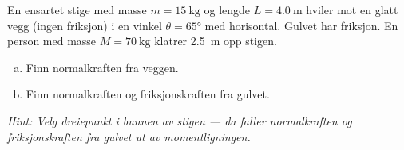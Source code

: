 %
%
En ensartet stige med masse $m = \SI{15}{\kilo\gram}$ og lengde $L = \SI{4.0}{\metre}$ hviler mot en glatt vegg (ingen friksjon) i en vinkel $\theta = 65°$ med horisontal. Gulvet har friksjon. En person med masse $M = \SI{70}{\kilo\gram}$ klatrer \SI{2.5}{\metre} opp stigen.
\begin{enumerate}[a)]
  \item Finn normalkraften fra veggen.
  \item Finn normalkraften og friksjonskraften fra gulvet.
\end{enumerate}
\textit{Hint: Velg dreiepunkt i bunnen av stigen — da faller normalkraften og friksjonskraften fra gulvet ut av momentligningen.}
